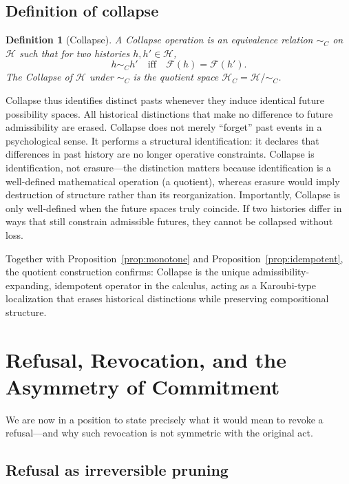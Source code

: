 \documentclass[11pt]{article}
\newtheorem{definition}{Definition}
\begin{document}
\subsection{Definition of collapse}

\begin{definition}[Collapse]
A Collapse operation is an equivalence relation $\sim_C$ on $\mathcal{H}$ such
that for two histories $h, h' \in \mathcal{H}$,
\[
h \sim_C h' \quad \text{iff} \quad \mathcal{F}(h) = \mathcal{F}(h').
\]
The Collapse of $\mathcal{H}$ under $\sim_C$ is the quotient space
$\mathcal{H}_C = \mathcal{H} / \sim_C$.
\end{definition}

Collapse thus identifies distinct pasts whenever they induce identical future
possibility spaces. All historical distinctions that make no difference to future
admissibility are erased. Collapse does not merely ``forget'' past events in a
psychological sense. It performs a structural identification: it declares that
differences in past history are no longer operative constraints. Collapse is
identification, not erasure---the distinction matters because identification is a
well-defined mathematical operation (a quotient), whereas erasure would imply
destruction of structure rather than its reorganization. Importantly, Collapse
is only well-defined when the future spaces truly coincide. If two histories
differ in ways that still constrain admissible futures, they cannot be collapsed
without loss.

Together with Proposition~\ref{prop:monotone} and Proposition~\ref{prop:idempotent},
the quotient construction confirms: Collapse is the unique admissibility-expanding,
idempotent operator in the calculus, acting as a Karoubi-type localization that
erases historical distinctions while preserving compositional structure.

\section{Refusal, Revocation, and the Asymmetry of Commitment}

We are now in a position to state precisely what it would mean to revoke a
refusal---and why such revocation is not symmetric with the original act.

\subsection{Refusal as irreversible pruning}
\end{document}
